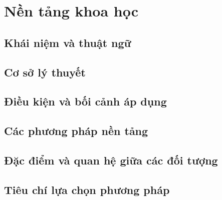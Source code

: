 \par{}
\section{Nền tảng khoa học}\label{section:background-1}

\par{}
\subsection{Khái niệm và thuật ngữ}\label{subsection:background-2}

\par{}
\subsection{Cơ sở lý thuyết}\label{subsection:background-3}

\par{}
\subsection{Điều kiện và bối cảnh áp dụng}\label{subsection:background-4}

\par{}
\subsection{Các phương pháp nền tảng}\label{subsection:background-5}

\par{}
\subsection{Đặc điểm và quan hệ giữa các đối tượng}\label{subsection:background-6}

\par{}
\subsection{Tiêu chí lựa chọn phương pháp}\label{subsection:background-7}

